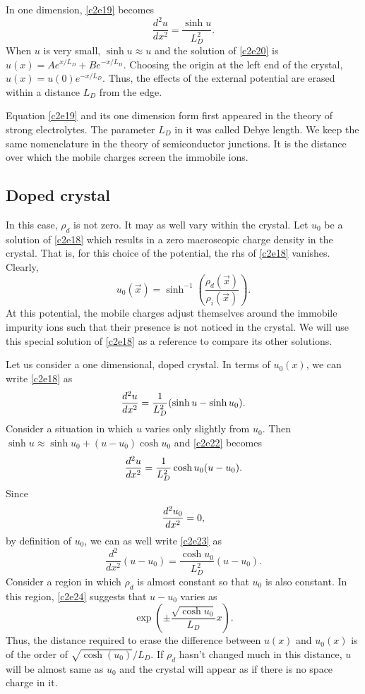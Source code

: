 In one dimension, \eqref{c2e19} becomes
\begin{equation}\label{c2e20}
\frac{d^2u}{dx^2} = \frac{\sinh u}{L_D^2}.
\end{equation}
When $u$ is very small, $\sinh u \approx u$ and the solution of \eqref{c2e20}
is $u(x) = Ae^{x/L_D} + Be^{-x/L_D}$. Choosing the origin at the left end of
the crystal, $u(x) = u(0)e^{-x/L_D}$. Thus, the effects of the external 
potential are erased within a distance $L_D$ from the edge. 

Equation \eqref{c2e19} and its one dimension form first appeared in the theory
of strong electrolytes. The parameter $L_D$ in it was called Debye length. We
keep the same nomenclature in the theory of semiconductor junctions. It is the
distance over which the mobile charges screen the immobile ions.

\subsection{Doped crystal}
In this case, $\rho_d$ is not zero. It may as well vary within the crystal. Let
$u_0$ be a solution of \eqref{c2e18} which results in a zero macroscopic charge
density in the crystal. That is, for this choice of the potential, the rhs of
\eqref{c2e18} vanishes. Clearly, 
\begin{equation}\label{c2e21}
u_0(\vec{x}) = \sinh^{-1}\left(\frac{\rho_d(\vec{x})}{\rho_i(\vec{x})}\right).
\end{equation}
At this potential, the mobile charges adjust themselves around the immobile
impurity ions such that their presence is not noticed in the crystal. We will
use this special solution of \eqref{c2e18} as a reference to compare its other
solutions.

Let us consider a one dimensional, doped crystal. In terms of $u_0(x)$, we can
write \eqref{c2e18} as
\begin{equation}\label{c2e22}
\frac{d^2{u}}{d{x}^2} = \frac{1}{L_D^2}(\sinh u - \sinh u_0).
\end{equation}
Consider a situation in which $u$ varies only slightly from $u_0$. Then
$\sinh u \approx \sinh u_0 + (u - u_0)\cosh u_0$ and \eqref{c2e22} becomes
\begin{equation}\label{c2e23}
\frac{d^2{u}}{d{x}^2} = \frac{1}{L_D^2}\cosh u_0 (u - u_0).
\end{equation}
Since 
\[
\frac{d^2{u_0}}{d{x}^2} = 0,
\]
by definition of $u_0$, we can as well write \eqref{c2e23} as
\begin{equation}\label{c2e24}
\frac{d^2}{dx^2}(u - u_0) = \frac{\cosh u_0}{L_D^2}(u - u_0).
\end{equation}
Consider a region in which $\rho_d$ is almost constant so that $u_0$ is also
constant. In this region, \eqref{c2e24} suggests that $u - u_0$ varies as
\[
\exp\left(\pm\frac{\sqrt{\cosh u_0}}{L_D} x\right).
\]
Thus, the distance required to erase the difference between $u(x)$ and $u_0(x)$
is of the order of $\sqrt{\cosh(u_0)}/L_D$. If $\rho_d$ hasn't changed much
in this distance, $u$ will be almost same as $u_0$ and the crystal will appear
as if there is no space charge in it.


